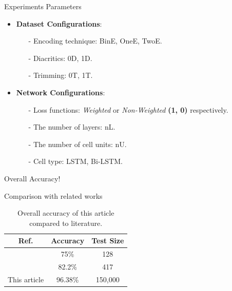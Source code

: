 \begin{frame}[fragile]{Experiments Parameters}
\begin{itemize}
	\item \textbf{Dataset Configurations}:
	\begin{itemize}
		\item [-] Encoding technique: BinE, OneE, TwoE.
		\item [-] Diacritics: 0D, 1D.
		\item [-] Trimming: 0T, 1T.
	\end{itemize}
\item \textbf{Network Configurations}:
\begin{itemize}
\item [-] Loss functions: \textit{Weighted} or \textit{Non-Weighted } \textbf{(1, 0)} respectively.
\item [-] The number of layers: nL.
\item [-] The number of cell units: nU.
\item [-] Cell type: LSTM, Bi-LSTM.
\end{itemize}
\end{itemize}
\end{frame}

\begin{frame}[fragile]{Overall Accuracy!}

\end{frame}


\begin{frame}[fragile]{Comparison with related works}
\begin{table}[h]
	\centering
	\begin{tabular}{c c c}
		\toprule
		\textbf{Ref.}& \textbf{Accuracy}& \textbf{Test Size} \\
		\midrule
		\cite{Alnagdawi2013FindingArabicPoemMeter} & 75\% & 128\\
		\cite{Abuata2016RuleBasedAlgorithm}& 82.2\% & 417\\
		This article & 96.38\%& 150,000 \\
		\bottomrule
	\end{tabular}
	\caption{Overall accuracy of this article compared to literature.}\label{Tab:Summary_Results}
\end{table}
\end{frame}


